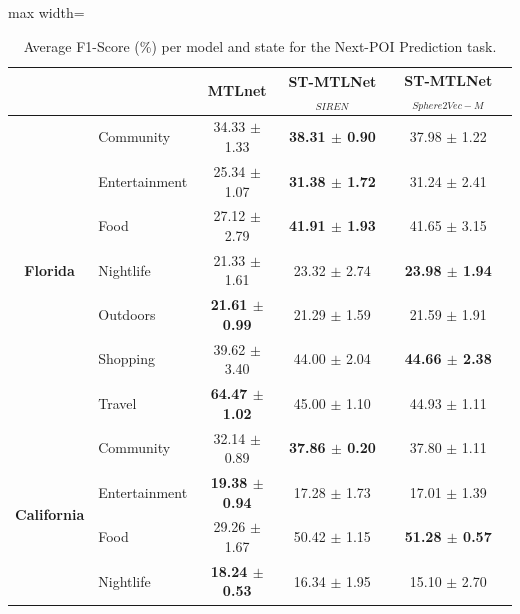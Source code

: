 \begin{table}[htbp]
\centering
\caption{Average F1-Score (\%) per model and state for the Next-POI Prediction task.}
\label{tab:courb:next}
\begin{adjustbox}{max width=\textwidth}
\begin{tabular}{clccc}
\toprule
 & & \textbf{MTLnet} & \textbf{ST-MTLNet$_{SIREN}$} & \textbf{ST-MTLNet$_{Sphere2Vec-M}$} \\
\midrule
\multirow{7}{*}{\textbf{Florida}} & Community & 34.33 $\pm$ 1.33 & \textbf{38.31 $\pm$ 0.90} & 37.98 $\pm$ 1.22 \\
 & Entertainment & 25.34 $\pm$ 1.07 & \textbf{31.38 $\pm$ 1.72} & 31.24 $\pm$ 2.41 \\
 & Food & 27.12 $\pm$ 2.79 & \textbf{41.91 $\pm$ 1.93} & 41.65 $\pm$ 3.15 \\
 & Nightlife & 21.33 $\pm$ 1.61 & 23.32 $\pm$ 2.74 & \textbf{23.98 $\pm$ 1.94} \\
 & Outdoors & \textbf{21.61 $\pm$ 0.99} & 21.29 $\pm$ 1.59 & 21.59 $\pm$ 1.91 \\
 & Shopping & 39.62 $\pm$ 3.40 & 44.00 $\pm$ 2.04 & \textbf{44.66 $\pm$ 2.38} \\
 & Travel & \textbf{64.47 $\pm$ 1.02} & 45.00 $\pm$ 1.10 & 44.93 $\pm$ 1.11 \\
\midrule
\multirow{7}{*}{\textbf{California}} & Community & 32.14 $\pm$ 0.89 & \textbf{37.86 $\pm$ 0.20} & 37.80 $\pm$ 1.11 \\
 & Entertainment & \textbf{19.38 $\pm$ 0.94} & 17.28 $\pm$ 1.73 & 17.01 $\pm$ 1.39 \\
 & Food & 29.26 $\pm$ 1.67 & 50.42 $\pm$ 1.15 & \textbf{51.28 $\pm$ 0.57} \\
 & Nightlife & \textbf{18.24 $\pm$ 0.53} & 16.34 $\pm$ 1.95 & 15.10 $\pm$ 2.70 \\

\end{tabular}
\end{adjustbox}
\end{table}

